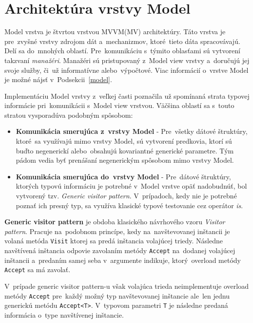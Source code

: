 \chapter{Architektúra vrstvy Model}\label{architektura_model_vrstvy}

Model vrstva je štvrtou vrstvou MVVM(MV) architektúry. Táto vrstva je pre~zvyšné vrstvy zdrojom dát a~mechanizmov, ktoré~tieto dáta spracovávajú. Delí sa do~mnohých oblastí. Pre~komunikáciu s~týmito oblasťami sú vytvorení takzvaní \textit{manažéri}. Manažéri sú pristupovaný z~Model view vrstvy a~doručujú jej svoje služby, či~už informatívne alebo~výpočtové. Viac informácií o~vrstve Model je možné nájsť v~Podsekcii~\ref{model}.

Implementáciu Model vrstvy z~veľkej časti poznačila už spomínaná strata typovej informácie pri~komunikácii s~Model view vrstvou. Väčšina oblastí sa s~touto stratou vysporadúva podobným spôsobom:
\begin{itemize}
    \item \textbf{Komunikácia smerujúca z~vrstvy Model} - Pre~všetky dátové štruktúry, ktoré~sa využívajú mimo vrstvy Model, sú vytvorení predkovia, ktorí sú buďto negenerickí alebo~obsahujú kovariantné generické parametre. Tým pádom vedia byť prenášaní negenerickým spôsobom mimo vrstvy Model.
    \item \textbf{Komunikácia smerujúca do~vrstvy Model} - Pre~dátové štruktúry, ktorých typovú informáciu je potrebné v~Model vrstve opäť nadobudnúť, bol vytvorený tzv. \textit{Generic visitor pattern}. V~prípadoch, kedy nie je potrebné poznať ich presný typ, sa využíva klasické typové testovanie cez operátor \textit{is}.
\end{itemize} 

\textbf{Generic visitor pattern} je obdoba klasického návrhového vzoru \emph{Visitor pattern}. Pracuje na~podobnom princípe, kedy na~navštevovanej inštancii je volaná metóda \texttt{Visit} ktorej sa predá inštancia volajúcej triedy. Následne navštívená inštancia odpovie zavolaním metódy \texttt{Accept} na~dodanej volajúcej inštancii a~predaním samej seba v~argumente indikuje, ktorý~overload metódy \texttt{Accept} sa má zavolať.

V~prípade generic visitor pattern-u však volajúca trieda neimplementuje overload metódy \texttt{Accept} pre~každý možný typ navštevovanej inštancie ale~len jednu generickú metódu \texttt{Accept<T>}. V~typovom parametri \texttt{T} je následne predaná informácia o~type navštívenej inštancie.

\bigskip

